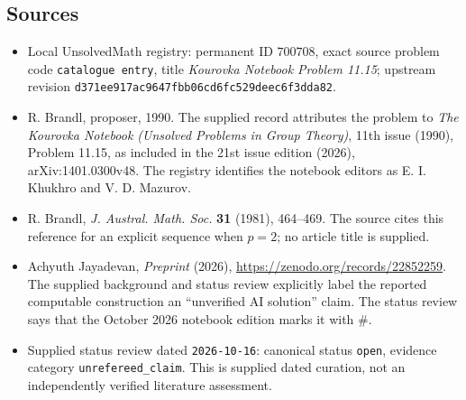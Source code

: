 \documentclass[11pt]{article}
\begin{document}
\subsection{Sources}
\begin{itemize}
\item Local UnsolvedMath registry: permanent ID \(700708\), exact source problem code \texttt{catalogue entry}, title \emph{Kourovka Notebook Problem 11.15}; upstream revision \texttt{d371ee917ac9647fbb06cd6fc529deec6f3dda82}.
\item R. Brandl, proposer, 1990. The supplied record attributes the problem to \emph{The Kourovka Notebook (Unsolved Problems in Group Theory)}, 11th issue (1990), Problem 11.15, as included in the 21st issue edition (2026), arXiv:1401.0300v48. The registry identifies the notebook editors as E. I. Khukhro and V. D. Mazurov.
\item R. Brandl, \emph{J. Austral. Math. Soc.} \textbf{31} (1981), 464--469. The source cites this reference for an explicit sequence when \(p=2\); no article title is supplied.
\item Achyuth Jayadevan, \emph{Preprint} (2026), \url{https://zenodo.org/records/22852259}. The supplied background and status review explicitly label the reported computable construction an ``unverified AI solution'' claim. The status review says that the October 2026 notebook edition marks it with \(\#\).
\item Supplied status review dated \texttt{2026-10-16}: canonical status \texttt{open}, evidence category \texttt{unrefereed\_claim}. This is supplied dated curation, not an independently verified literature assessment.
\end{itemize}
\end{document}

